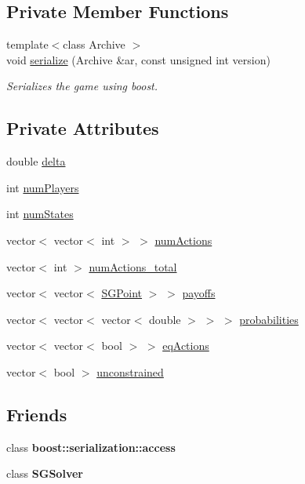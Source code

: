 \subsection*{Private Member Functions}
\begin{DoxyCompactItemize}
\item 
\mbox{\label{classSGGame_a383c8f7ec881befac40d6e45c7e1b775}} 
{\footnotesize template$<$class Archive $>$ }\\void \hyperlink{classSGGame_a383c8f7ec881befac40d6e45c7e1b775}{serialize} (Archive \&ar, const unsigned int version)
\begin{DoxyCompactList}\small\item\em Serializes the game using boost. \end{DoxyCompactList}\end{DoxyCompactItemize}
\subsection*{Private Attributes}
\begin{DoxyCompactItemize}
\item 
double \hyperlink{classSGGame_a5031fc31f8009c19901c0930224e0465}{delta}
\item 
int \hyperlink{classSGGame_a6f02e3f92db6a3c5d2d9076dcb7b6d61}{num\+Players}
\item 
int \hyperlink{classSGGame_ae7b105b2fe9ee277d38e518223dd0482}{num\+States}
\item 
vector$<$ vector$<$ int $>$ $>$ \hyperlink{classSGGame_acebe94d195ffb67f92925bcd4c26d1a9}{num\+Actions}
\item 
vector$<$ int $>$ \hyperlink{classSGGame_a3b219a37177b5b8b38737f570e419429}{num\+Actions\+\_\+total}
\item 
vector$<$ vector$<$ \hyperlink{classSGPoint}{S\+G\+Point} $>$ $>$ \hyperlink{classSGGame_aad28dd39c6359e772286a938a948634c}{payoffs}
\item 
vector$<$ vector$<$ vector$<$ double $>$ $>$ $>$ \hyperlink{classSGGame_a167a281b11d524cb4a11dbaff3e9de68}{probabilities}
\item 
vector$<$ vector$<$ bool $>$ $>$ \hyperlink{classSGGame_aacb0878b1e95ef3ff42cb88ac617c0b8}{eq\+Actions}
\item 
vector$<$ bool $>$ \hyperlink{classSGGame_a528852e11bd68322535d7f24a41eca20}{unconstrained}
\end{DoxyCompactItemize}
\subsection*{Friends}
\begin{DoxyCompactItemize}
\item 
\mbox{\label{classSGGame_ac98d07dd8f7b70e16ccb9a01abf56b9c}} 
class {\bfseries boost\+::serialization\+::access}
\item 
\mbox{\label{classSGGame_a8b0e5d2bebfed7e7e032366bb49bc5f1}} 
class {\bfseries S\+G\+Solver}
\end{DoxyCompactItemize}


